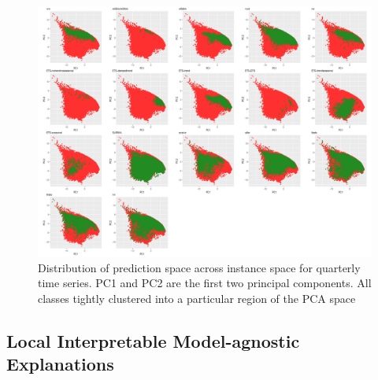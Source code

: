 \documentclass[11pt,a4paper,]{article}
\begin{document}
\begin{figure}
\centering
\includegraphics{figures/quarterlypca-1.png}
\caption{\label{fig:quarterlypca}Distribution of prediction space across
instance space for quarterly time series. PC1 and PC2 are the first two
principal components. All classes tightly clustered into a particular
region of the PCA space}
\end{figure}

\subsection{Local Interpretable Model-agnostic
Explanations}\label{local-interpretable-model-agnostic-explanations}
\end{document}
